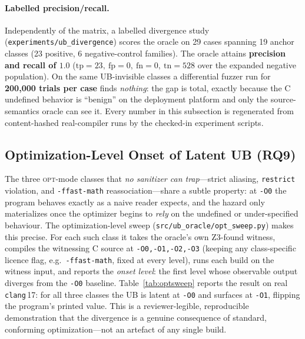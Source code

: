 \documentclass[10pt,a4paper]{article}
\begin{document}
\paragraph{Labelled precision/recall.} Independently of the matrix, a labelled
divergence study (\texttt{experiments/ub\_divergence}) scores the oracle on
29 cases spanning 19 anchor classes (23 positive, 6 negative-control families). The
oracle attains \textbf{precision and recall of $1.0$}
($\mathrm{tp}=23,\ \mathrm{fp}=0,\ \mathrm{fn}=0,\ \mathrm{tn}=528$ over the
expanded negative population). On the same UB-invisible classes a differential
fuzzer run for \textbf{200{,}000 trials per case} finds \emph{nothing}: the gap
is total, exactly because the C undefined behavior is ``benign'' on the
deployment platform and only the source-semantics oracle can see it. Every
number in this subsection is regenerated from content-hashed real-compiler runs
by the checked-in experiment scripts.

\subsection{Optimization-Level Onset of Latent UB
(RQ9)}\label{sec:eval-optsweep}

The three \textsc{opt}-mode classes that \emph{no sanitizer can trap}---strict
aliasing, \texttt{restrict} violation, and \texttt{-ffast-math}
reassociation---share a subtle property: at \texttt{-O0} the program behaves
exactly as a naive reader expects, and the hazard only materializes once the
optimizer begins to \emph{rely} on the undefined or under-specified behaviour.
The optimization-level sweep (\texttt{src/ub\_oracle/opt\_sweep.py}) makes this
precise. For each such class it takes the oracle's own Z3-found witness,
compiles the witnessing C source at \texttt{-O0,-O1,-O2,-O3} (keeping any
class-specific licence flag, e.g.\ \texttt{-ffast-math}, fixed at every level),
runs each build on the witness input, and reports the \emph{onset level}: the
first level whose observable output diverges from the \texttt{-O0} baseline.
Table~\ref{tab:optsweep} reports the result on real \texttt{clang}\,17: for all
three classes the UB is latent at \texttt{-O0} and surfaces at \texttt{-O1},
flipping the program's printed value. This is a reviewer-legible, reproducible
demonstration that the divergence is a genuine consequence of standard,
conforming optimization---not an artefact of any single build.
\end{document}

